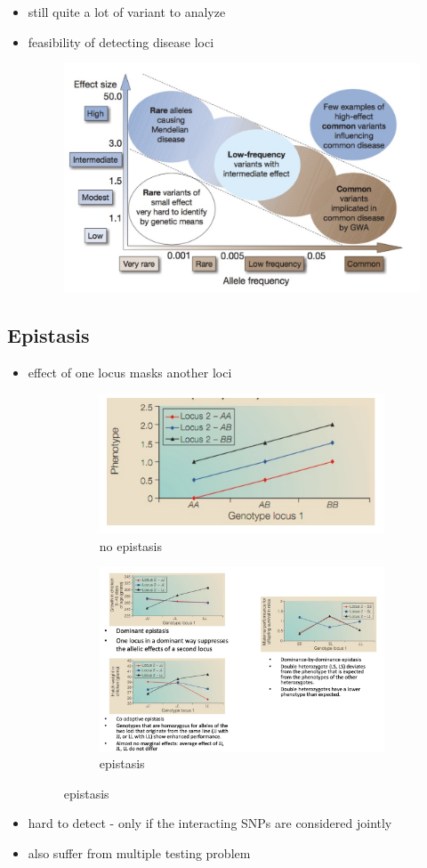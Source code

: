 \documentclass[font=12pt]{article}
\begin{document}
\begin{itemize}
	\item still quite a lot of variant to analyze
	\item feasibility of detecting disease loci\begin{figure}[h!]
		\centering
		\includegraphics[width=0.5\linewidth]{feasibility.png}
		\caption{}
		\label{fig:feasibilitygwasloci}
	\end{figure}
\end{itemize}
\subsection{Epistasis}
\begin{itemize}
	\item effect of one locus masks another loci\begin{figure}[h!]
		\centering
		\begin{subfigure}[b]{0.6\linewidth}
		\includegraphics[width=0.6\linewidth]{noepistasis}
		\centering
		\caption{no epistasis}
		\label{fig:noepistasis}
		\end{subfigure}
		\begin{subfigure}[b]{\linewidth}
		\centering
		\includegraphics[width=0.7\linewidth]{epistasis}
		\caption{epistasis}
		\label{fig:epistasis}
	\end{subfigure}
	\end{figure}
	\item hard to detect - only if the interacting SNPs are considered jointly
	\item also suffer from multiple testing problem
\end{itemize}
\end{document}
